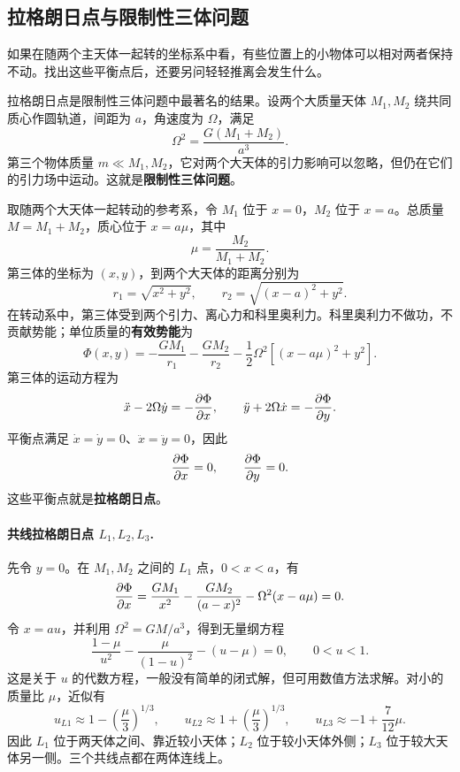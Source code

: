 \subsection{拉格朗日点与限制性三体问题}

如果在随两个主天体一起转的坐标系中看，有些位置上的小物体可以相对两者保持不动。找出这些平衡点后，还要另问轻轻推离会发生什么。

拉格朗日点是限制性三体问题中最著名的结果。设两个大质量天体 $M_1,M_2$ 绕共同质心作圆轨道，间距为 $a$，角速度为 $\Omega$，满足
\begin{equation}
\Omega^2=\frac{G(M_1+M_2)}{a^3}.
\end{equation}
第三个物体质量 $m\ll M_1,M_2$，它对两个大天体的引力影响可以忽略，但仍在它们的引力场中运动。这就是\textbf{限制性三体问题}。

取随两个大天体一起转动的参考系，令 $M_1$ 位于 $x=0$，$M_2$ 位于 $x=a$。总质量 $M=M_1+M_2$，质心位于 $x=a\mu$，其中
\begin{equation}
\mu=\frac{M_2}{M_1+M_2}.
\end{equation}
第三体的坐标为 $(x,y)$，到两个大天体的距离分别为
\begin{equation}
r_1=\sqrt{x^2+y^2},\qquad
r_2=\sqrt{(x-a)^2+y^2}.
\end{equation}
在转动系中，第三体受到两个引力、离心力和科里奥利力。科里奥利力不做功，不贡献势能；单位质量的\textbf{有效势能}为
\begin{equation}
\Phi(x,y)=-\frac{GM_1}{r_1}-\frac{GM_2}{r_2}
-\frac12\Omega^2\left[(x-a\mu)^2+y^2\right].
\label{eq:lagrange-effective}
\end{equation}
第三体的运动方程为
\begin{equation}
\ddot x-2\Omega\dot y=-\frac{\partial \Phi}{\partial x},\qquad
\ddot y+2\Omega\dot x=-\frac{\partial \Phi}{\partial y}.
\label{eq:lagrange-eom}
\end{equation}
平衡点满足 $\dot x=\dot y=0$、$\ddot x=\ddot y=0$，因此
\begin{equation}
\frac{\partial \Phi}{\partial x}=0,\qquad
\frac{\partial \Phi}{\partial y}=0.
\label{eq:lagrange-equilibrium}
\end{equation}
这些平衡点就是\textbf{拉格朗日点}。

\paragraph{共线拉格朗日点 $L_1,L_2,L_3$.}
先令 $y=0$。在 $M_1,M_2$ 之间的 $L_1$ 点，$0<x<a$，有
\[
\frac{\partial \Phi}{\partial x}
=\frac{GM_1}{x^2}-\frac{GM_2}{(a-x)^2}
-\Omega^2(x-a\mu)=0.
\]
令 $x=au$，并利用 $\Omega^2=GM/a^3$，得到无量纲方程
\begin{equation}
\frac{1-\mu}{u^2}-\frac{\mu}{(1-u)^2}-(u-\mu)=0,
\qquad 0<u<1.
\label{eq:L1-equation}
\end{equation}
这是关于 $u$ 的代数方程，一般没有简单的闭式解，但可用数值方法求解。对小的质量比 $\mu$，近似有
\begin{equation}
u_{L1}\approx1-\left(\frac{\mu}{3}\right)^{1/3},\qquad
u_{L2}\approx1+\left(\frac{\mu}{3}\right)^{1/3},\qquad
u_{L3}\approx-1+\frac{7}{12}\mu .
\end{equation}
因此 $L_1$ 位于两天体之间、靠近较小天体；$L_2$ 位于较小天体外侧；$L_3$ 位于较大天体另一侧。三个共线点都在两体连线上。

